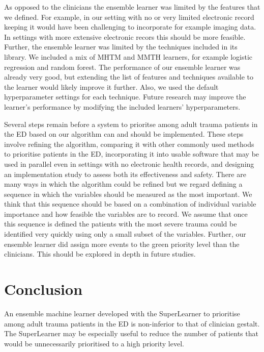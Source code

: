 \documentclass[10pt,letterpaper]{article}\usepackage[]{graphicx}\usepackage[]{color}
\begin{document}
As opposed to the clinicians the ensemble learner was limited by the features
that we defined. For example, in our setting with no or very limited electronic
record keeping it would have been challenging to incorporate for example imaging
data. In settings with more extensive electronic recors this should be more
feasible. Further, the ensemble learner was limited by the techniques included
in its library. We included a mix of MHTM and MMTH learners, for example
logistic regression and random forest. The performance of our ensemble learner
was already very good, but extending the list of features and techniques
available to the learner would likely improve it further.  Also, we used the
default hyperparameter settings for each technique. Future research may improve
the learner's performance by modifying the included learners' hyperparameters.

Several steps remain before a system to prioritse among adult trauma patients in
the ED based on our algorithm can and should be implemented. These steps involve
refining the algorithm, comparing it with other commonly used methods to
prioritise patients in the ED, incorporating it into usable software that may be
used in parallel even in settings with no electronic health records, and
designing an implementation study to assess both its effectiveness and
safety. There are many ways in which the algorithm could be refined but we
regard defining a sequence in which the variables should be measured as the most
important. We think that this sequence should be based on a combination of
individual variable importance and how feasible the variables are to record. We
assume that once this sequence is defined the patients with the most severe
trauma could be identified very quickly using only a small subset of the
variables. Further, our ensemble learner did assign more events to the green
priority level than the clinicians. This should be explored in depth in future
studies.

\section*{Conclusion}
An ensemble machine learner developed with the SuperLearner to prioritise among
adult trauma patients in the ED is non-inferior to that of clinician
gestalt. The SuperLearner may be especially useful to reduce the number of
patients that would be unnecessarily prioritised to a high priority level.

\end{document}
